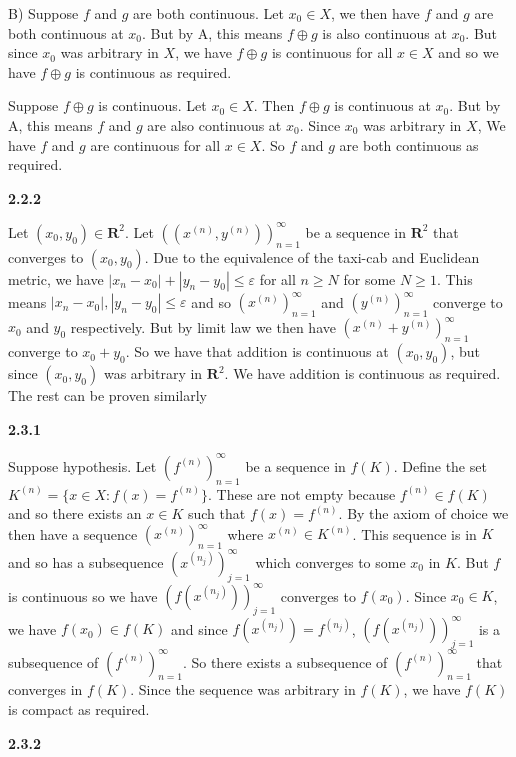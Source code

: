 \documentclass[12pt]{article}
\begin{document}
B) Suppose $f$ and $g$ are both continuous. Let $x_0\in X$, we then have $f$ and $g$ are both continuous at $x_0$. But by A, this means $f\oplus g$ is also continuous at $x_0$. But since $x_0$ was arbitrary in $X$, we have $f\oplus g$ is continuous for all $x\in X$ and so we have $f\oplus g$ is continuous  as required. 

Suppose $f\oplus g$ is continuous. Let $x_0\in X$. Then $f\oplus g$ is continuous at $x_0$. But by A, this means $f$ and $g$ are also continuous at $x_0$. Since $x_0$ was arbitrary in $X$, We have $f$ and $g$ are continuous for all $x\in X$. So $f$ and $g$ are both continuous as required.   

\textbf{2.2.2}

Let $(x_0,y_0)\in \textbf{R}^2$. Let $((x^{(n)},y^{(n)}))^\infty_{n=1}$ be a sequence in $\textbf{R}^2$ that converges to $(x_0,y_0)$. Due to the equivalence of the taxi-cab and Euclidean metric, we have $ |x_n-x_0| + |y_n-y_0| \leq \varepsilon$ for all $n\geq N$ for some $N\geq 1$. This means $|x_n-x_0|,|y_n-y_0|\leq \varepsilon$ and so $(x^{(n)})^\infty_{n=1}$ and $(y^{(n)})^\infty_{n=1}$ converge to $x_0$ and $y_0$ respectively. But by limit law we then have $(x^{(n)} +y^{(n)})^\infty_{n=1}$ converge to $x_0+y_0$. So we have that addition is continuous at $(x_0,y_0)$, but since $(x_0,y_0)$ was arbitrary in $\textbf{R}^2$. We have addition is continuous as required. The rest can be proven similarly

\textbf{2.3.1}

Suppose hypothesis. Let $(f^{(n)})^\infty_{n=1}$ be a sequence in $ f(K)$. Define the set $K^{(n)} = \{x\in X:f(x) = f^{(n)} \}$. These are not empty because $f^{(n)}\in  f(K)$ and so there exists an $x\in K$ such that $f(x) = f^{(n)}$. By the axiom of choice we then have a sequence $(x^{(n)})^\infty_{n=1}$ where $x^{(n)}\in K^{(n)}$. This sequence is in $K$ and so has a subsequence $(x^{(n_j)})^\infty_{j=1}$ which converges to some $x_0$ in $K$. But $f$ is continuous so we have $(f(x^{(n_j)}))^\infty_{j=1}$ converges to $f(x_0)$. Since $x_0\in K$, we have $f(x_0)\in f(K)$ and since $f(x^{(n_j)}) = f^{(n_j)}$, $(f(x^{(n_j)}))^\infty_{j=1}$ is a subsequence of $(f^{(n)})^\infty_{n=1}$. So there exists a subsequence of $(f^{(n)})^\infty_{n=1}$ that converges in $f(K)$. Since the sequence was arbitrary in $f(K)$, we have $f(K)$ is compact as required.

\textbf{2.3.2}
\end{document}
